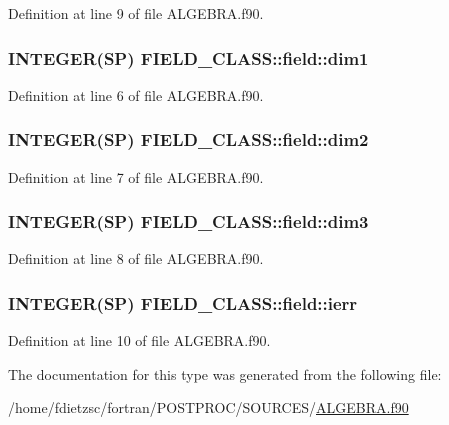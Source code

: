 Definition at line 9 of file ALGEBRA.f90.

\hypertarget{typeFIELD__CLASS_1_1field_a370710dc9047b03120f6c7a17403805d}{
\subsubsection[{dim1}]{\setlength{\rightskip}{0pt plus 5cm}INTEGER(SP) {\bf FIELD\_\-CLASS::field::dim1}}}
\label{typeFIELD__CLASS_1_1field_a370710dc9047b03120f6c7a17403805d}


Definition at line 6 of file ALGEBRA.f90.

\hypertarget{typeFIELD__CLASS_1_1field_a44feaba31e860b83d47d9a3daee820e4}{
\subsubsection[{dim2}]{\setlength{\rightskip}{0pt plus 5cm}INTEGER(SP) {\bf FIELD\_\-CLASS::field::dim2}}}
\label{typeFIELD__CLASS_1_1field_a44feaba31e860b83d47d9a3daee820e4}


Definition at line 7 of file ALGEBRA.f90.

\hypertarget{typeFIELD__CLASS_1_1field_a53ff81eafe27728c0e0e3ace291e767f}{
\subsubsection[{dim3}]{\setlength{\rightskip}{0pt plus 5cm}INTEGER(SP) {\bf FIELD\_\-CLASS::field::dim3}}}
\label{typeFIELD__CLASS_1_1field_a53ff81eafe27728c0e0e3ace291e767f}


Definition at line 8 of file ALGEBRA.f90.

\hypertarget{typeFIELD__CLASS_1_1field_abcd9a96e4cd329576b3dca7ff0ccfa0a}{
\subsubsection[{ierr}]{\setlength{\rightskip}{0pt plus 5cm}INTEGER(SP) {\bf FIELD\_\-CLASS::field::ierr}}}
\label{typeFIELD__CLASS_1_1field_abcd9a96e4cd329576b3dca7ff0ccfa0a}


Definition at line 10 of file ALGEBRA.f90.



The documentation for this type was generated from the following file:\begin{DoxyCompactItemize}
\item 
/home/fdietzsc/fortran/POSTPROC/SOURCES/\hyperlink{ALGEBRA_8f90}{ALGEBRA.f90}\end{DoxyCompactItemize}
